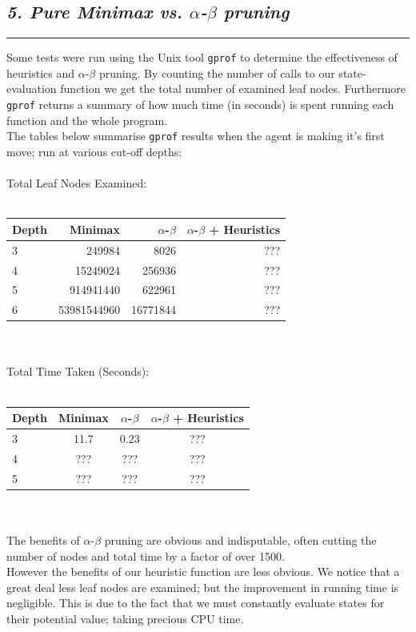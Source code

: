 \documentclass[10pt]{article}
\begin{document}
\begin{multicols}{2}
\subsection*{\emph { \textmd{5. Pure Minimax vs. $\alpha$-$\beta$ pruning}}}
\hrule
\vspace{0.4cm}
Some tests were run using the Unix tool \texttt{gprof} to determine the effectiveness
of heuristics and $\alpha$-$\beta$ pruning. By counting the number of calls
to our state-evaluation function we get the total number of examined leaf nodes.
Furthermore \texttt{gprof} returns a summary of how much time (in seconds) is spent running
each function and the whole program.\\
The tables below summarise \texttt{gprof} results when the agent is making it's first move;
run at various cut-off depths:\\\\
Total Leaf Nodes Examined:\\\\
\begin{tabular}{  l  r r r  }
  \toprule
  Depth & Minimax & $\alpha$-$\beta$ & $\alpha$-$\beta$ + Heuristics \\
  \midrule
  3 & 249984 & 8026 & ??? \\
  4 & 15249024 & 256936 & ??? \\
  5 & 914941440 & 622961 & ??? \\
  6 & 53981544960 & 16771844 & ??? \\
  \bottomrule
\end{tabular}\\\\
Total Time Taken (Seconds):\\\\
\begin{tabular}{ l  c c c  }
  \toprule
  Depth & Minimax & $\alpha$-$\beta$ & $\alpha$-$\beta$ + Heuristics \\
  \midrule
  3 & 11.7 & 0.23 & ??? \\
  4 & ??? & ??? & ??? \\
  5 & ??? & ??? & ??? \\
  \bottomrule
\end{tabular}\\\\
The benefits of $\alpha$-$\beta$ pruning are obvious and indisputable, often cutting
the number of nodes and total time by a factor of over 1500.\\
However the benefits of our heuristic function are less obvious. We notice that
a great deal less leaf nodes are examined; but the improvement in running time is
negligible. This is due to the fact that we must constantly evaluate states for their
potential value; taking precious CPU time.


\end{multicols}
\end{document}
